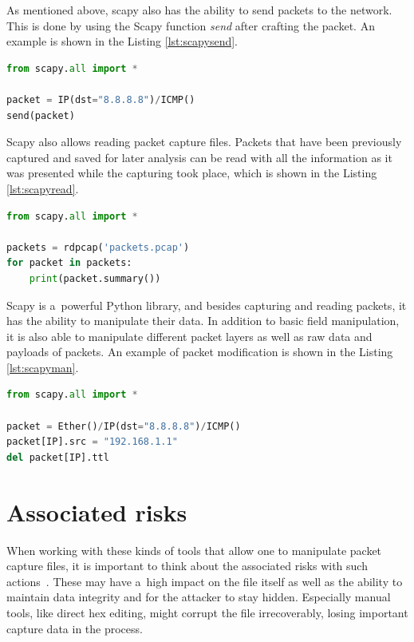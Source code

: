 \documentclass[
  printed,     %
  color,       %
  oneside,     %
  nosansbold,  %
  nocolorbold, %
  nolof,         %
  nolot,         %
]{fithesis4}
\begin{document}
As mentioned above, scapy also has the ability to send packets to the network. This is done by using the Scapy function \textit{send} after crafting the packet. An example is shown in the Listing \ref{lst:scapysend}.

\begin{lstlisting}[language=python, caption={Sending packets}, label={lst:scapysend}]
from scapy.all import *

packet = IP(dst="8.8.8.8")/ICMP()
send(packet)
\end{lstlisting}

Scapy also allows reading packet capture files. Packets that have been previously captured and saved for later analysis can be read with all the information as it was presented while the capturing took place, which is shown in the Listing \ref{lst:scapyread}.

\begin{lstlisting}[language=python, caption={Reading a~PCAP file}, label={lst:scapyread}]
from scapy.all import *

packets = rdpcap('packets.pcap')
for packet in packets:
    print(packet.summary())
\end{lstlisting}

Scapy is a~powerful Python library, and besides capturing and reading packets, it has the ability to manipulate their data. In addition to basic field manipulation, it is also able to manipulate different packet layers as well as raw data and payloads of packets. An example of packet modification is shown in the Listing \ref{lst:scapyman}.

\begin{lstlisting}[language=python, caption={Manipulating packets}, label={lst:scapyman}]
from scapy.all import *

packet = Ether()/IP(dst="8.8.8.8")/ICMP()
packet[IP].src = "192.168.1.1"
del packet[IP].ttl
\end{lstlisting}


\section{Associated risks}

When working with these kinds of tools that allow one to manipulate packet capture files, it is important to think about the associated risks with such actions~\cite{Messier2017-fz}. These may have a~high impact on the file itself as well as the ability to maintain data integrity and for the attacker to stay hidden. Especially manual tools, like direct hex editing, might corrupt the file irrecoverably, losing important capture data in the process.
\end{document}
